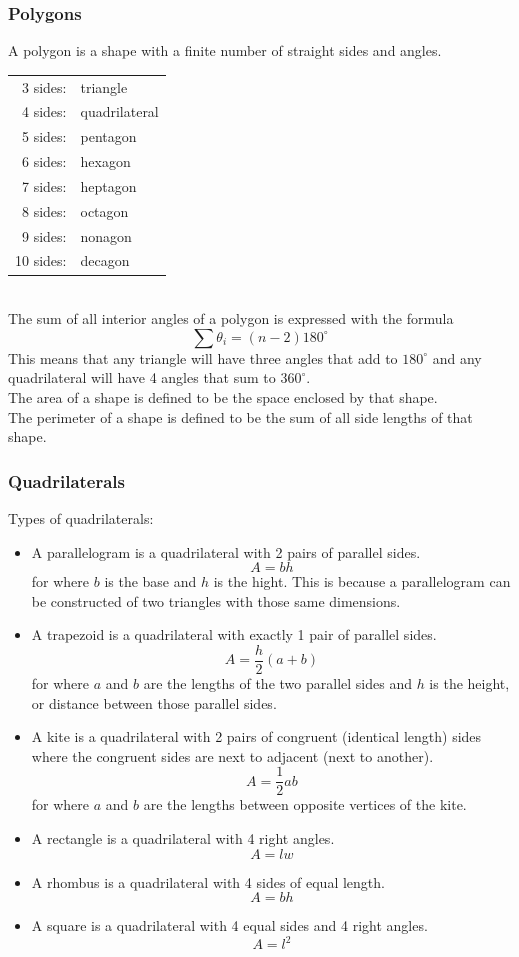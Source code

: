 \documentclass[11pt, fleqn]{article}
\begin{document}
\subsubsection{Polygons}
A polygon is a shape with a finite number of straight sides and angles.\\
\begin{tabular}{rl}
    3 sides: & triangle\\
    4 sides: & quadrilateral\\
    5 sides: & pentagon\\
    6 sides: & hexagon\\
    7 sides: & heptagon\\
    8 sides: & octagon\\
    9 sides: & nonagon\\
    10 sides: & decagon
\end{tabular}\\
The sum of all interior angles of a polygon is expressed with the formula
$$\sum\theta_i=(n-2)180^\circ$$
This means that any triangle will have three angles that add to $180^\circ$ and any quadrilateral will have 4 angles that sum to $360^\circ$.\\
The area of a shape is defined to be the space enclosed by that shape.\\
The perimeter of a shape is defined to be the sum of all side lengths of that shape.

\subsubsection{Quadrilaterals}
Types of quadrilaterals:
\begin{itemize}
    \item A parallelogram is a quadrilateral with 2 pairs of parallel sides.
    $$A=bh$$
    for where $b$ is the base and $h$ is the hight. This is because a parallelogram can be constructed of two triangles with those same dimensions.
    \item A trapezoid is a quadrilateral with exactly 1 pair of parallel sides.
    $$A=\frac{h}{2}(a+b)$$
    for where $a$ and $b$ are the lengths of the two parallel sides and $h$ is the height, or distance between those parallel sides.
    \item A kite is a quadrilateral with 2 pairs of congruent (identical length) sides where the congruent sides are next to adjacent (next to another).
    $$A=\frac{1}{2}ab$$
    for where $a$ and $b$ are the lengths between opposite vertices of the kite.
    \item A rectangle is a quadrilateral with 4 right angles.
    $$A=lw$$
    \item A rhombus is a quadrilateral with 4 sides of equal length.
    $$A=bh$$
    \item A square is a quadrilateral with 4 equal sides and 4 right angles.
    $$A=l^2$$
\end{itemize}
\end{document}
